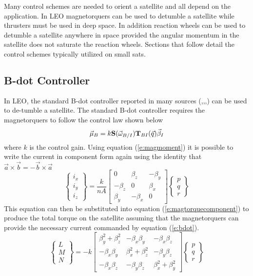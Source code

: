 \documentclass{article}
\begin{document}
Many control schemes are needed to orient a satellite and all depend
on the application. In LEO magnetorquers can be used to detumble a
satellite while thrusters must be used in deep space. In addition
reaction wheels can be used to detumble a satellite anywhere in space
provided the angular momentum in the satellite does not saturate the
reaction wheels. Sections that follow detail the control schemes
typically utilized on small sats. 

\subsection{B-dot Controller}

In LEO, the standard B-dot controller reported in many sources
(\cite{Leomanni2012},\cite{Lovera2015},\cite{WInstitute},\cite{SanyalDick})
can be used to de-tumble a satellite. The standard B-dot controller
requires the magnetorquers to follow the control law shown below
\begin{equation}\label{e:bdotcompact}
  \vec{\mu}_B = k{\bf S}(\vec{\omega}_{B/I}){\bf T}_{BI}(\vec{q})\vec{\beta}_I
\end{equation}
where $k$ is the control gain. Using equation (\ref{e:magmoment}) it
is possible to write the current in component form again
using the identity that $\vec{a}\times\vec{b}=-\vec{b}\times\vec{a}$
\begin{equation}\label{e:bdot}
  \begin{Bmatrix} i_{x}
    \\ i_{y} \\ i_{z} \end{Bmatrix} = \frac{k}{nA}\begin{bmatrix} 0 & \beta_z & -\beta_y \\ -\beta_z & 0 &
  \beta_x \\ \beta_y & -\beta_x & 0 \end{bmatrix}\begin{Bmatrix} p
    \\ q \\ r \end{Bmatrix}
\end{equation}
This equation can then be substituted into equation
(\ref{e:magtorquecomponent}) to produce the total torque on the
satellite assuming that the magnetorquers can provide the necessary
current commanded by equation (\ref{e:bdot}).
\begin{equation}\label{e:bdotfinal}
  \begin{Bmatrix} L \\ M \\ N \end{Bmatrix} = -k \begin{bmatrix}
    \beta_y^2 + \beta_z^2 & -\beta_x\beta_y & -\beta_x\beta_z
    \\ -\beta_x\beta_y & \beta_x^2 + \beta_z^2 & -\beta_y\beta_z \\
    -\beta_x\beta_z & -\beta_y\beta_z & \beta_x^2 +
    \beta_y^2 \end{bmatrix} \begin{Bmatrix} p
    \\ q \\ r \end{Bmatrix} 
\end{equation}
\end{document}
